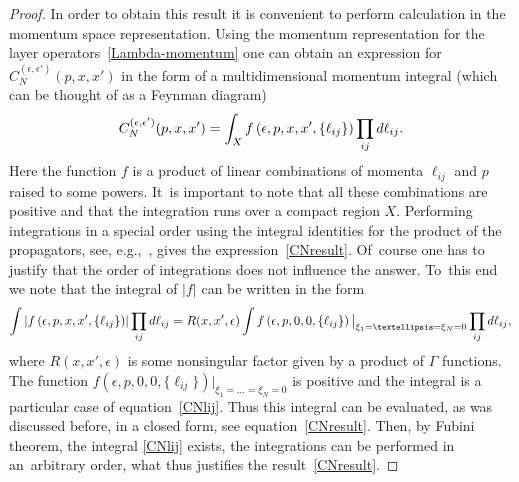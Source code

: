 \documentclass[11pt]{article}
\numberwithin{equation}{section}
\numberwithin{equation}{section}
\begin{document}
\begin{proof}
In order to obtain this result it is convenient to perform calculation in the momentum space representation. Using the momentum
representation for the layer operators~\eqref{Lambda-momentum} one can obtain an expression for $C_N^{( \epsilon, \epsilon')}(p, x, x')$ in
the form of a multidimensional momentum integral (which can be thought of as a Feynman diagram)
\begin{gather}\label{CNlij}
C_N^{( \epsilon, \epsilon')}(p,x, x')
 = \int_X f\left( \epsilon,p, x, x',\{\ell_{ij}\}\right) \prod_{ij}{\rm d}\ell_{ij}.
\end{gather}
Here the function $f$ is a product of linear combinations of momenta $\ell_{ij}$ and $p$ raised to some powers. It~is important to note
that all these combinations are positive and that the integration runs over a compact region $X$. Performing integrations in a special
order using the integral identities for the product of the propagators, see,
e.g.,~\cite{Derkachov:2003qb,Derkachov:2002tf,DMspinchainandSL2RGustafson}, gives the expression~\eqref{CNresult}. Of~course one
has to justify that the order of integrations does not influence the answer. To~this end we note that the integral of $|f|$ can be written
in the form
\begin{gather*}%
\int \left|f\left( \epsilon,p, x, x',\{\ell_{ij}\}\right)\right| \prod_{ij}{\rm d}\ell_{ij} =
R( x, x',\epsilon)\int f\left( \epsilon,p, 0, 0,\{\ell_{ij}\}\right)\big|_{\xi_1=\dots=\xi_N=0} \prod_{ij}{\rm d}\ell_{ij},
\end{gather*}
where $R( x, x',\epsilon)$ is some nonsingular factor given by a product of $\Gamma$ functions. The function $f\left(\epsilon,p, 0, 0,\{\ell_{ij}\}\right)\big|_{\xi_1=\dots=\xi_N=0}$ is positive and the integral is a particular case of equation~\eqref{CNlij}. Thus this integral can
be evaluated, as was discussed before, in a closed form, see equation~\eqref{CNresult}. Then, by Fubini theorem, the integral \eqref{CNlij}
exists, the integrations can be performed in an~arbi\-t\-rary order, what thus justifies the result~\eqref{CNresult}.




\end{proof}
\end{document}
